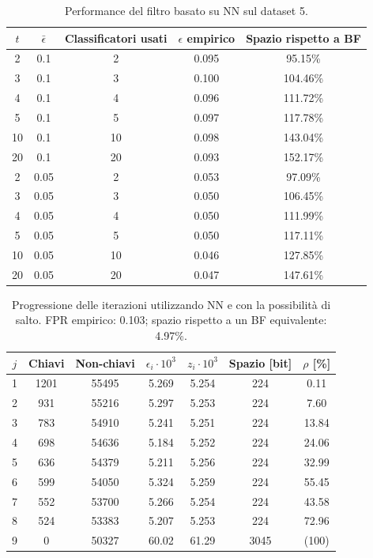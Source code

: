 \begin{table}
    \centering
    \begin{tabular}{|c|c|c|c|c|}
        \hline
        $t$  & $\bar\epsilon$ & Classificatori usati & $\epsilon$ empirico & Spazio rispetto a BF \\ 
        \hline
        2   & 0.1  & 2  & 0.095 & 95.15\% \\ 
        3   & 0.1  & 3  & 0.100 & 104.46\% \\ 
        4   & 0.1  & 4  & 0.096 & 111.72\% \\ 
        5   & 0.1  & 5  & 0.097 & 117.78\% \\  
        10  & 0.1  & 10 & 0.098 & 143.04\% \\  
        20  & 0.1  & 20 & 0.093 & 152.17\% \\  
        2   & 0.05 & 2  & 0.053 & 97.09\% \\ 
        3   & 0.05 & 3  & 0.050 & 106.45\% \\ 
        4   & 0.05 & 4  & 0.050 & 111.99\% \\ 
        5   & 0.05 & 5  & 0.050 & 117.11\% \\  
        10  & 0.05 & 10 & 0.046 & 127.85\% \\  
        20  & 0.05 & 20 & 0.047 & 147.61\% \\  
        \hline
    \end{tabular}
    \caption{Performance del filtro basato su NN sul dataset 5.}
    \label{tab:performance-ds5-mlp}
\end{table}
\begin{table}
\centering
\begin{tabular}{|c|c|c|c|c|c|c|}
\hline
$j$ & Chiavi & Non-chiavi & $\epsilon_i \cdot 10^3$ & $z_i \cdot 10^3$ & Spazio [bit] & $\rho$ [\%] \\
\hline
1 & 1201 & 55495 & 5.269 & 5.254 & 224 & 0.11 \\
2 & 931 & 55216 & 5.297 & 5.253 & 224 & 7.60 \\
3 & 783 & 54910 & 5.241 & 5.251 & 224 & 13.84 \\
4 & 698 & 54636 & 5.184 & 5.252 & 224 & 24.06 \\
5 & 636 & 54379 & 5.211 & 5.256 & 224 & 32.99 \\
6 & 599 & 54050 & 5.324 & 5.259 & 224 & 55.45 \\
7 & 552 & 53700 & 5.266 & 5.254 & 224 & 43.58 \\
8 & 524 & 53383 & 5.207 & 5.253 & 224 & 72.96 \\
9 & 0 & 50327 & 60.02 & 61.29 & 3045 & (100) \\
\hline
\end{tabular}
\caption{Progressione delle iterazioni utilizzando NN e con la possibilità di salto. FPR empirico: 0.103; spazio rispetto a un BF equivalente: 4.97\%.}
\label{tab:mlp-skip}
\end{table}
